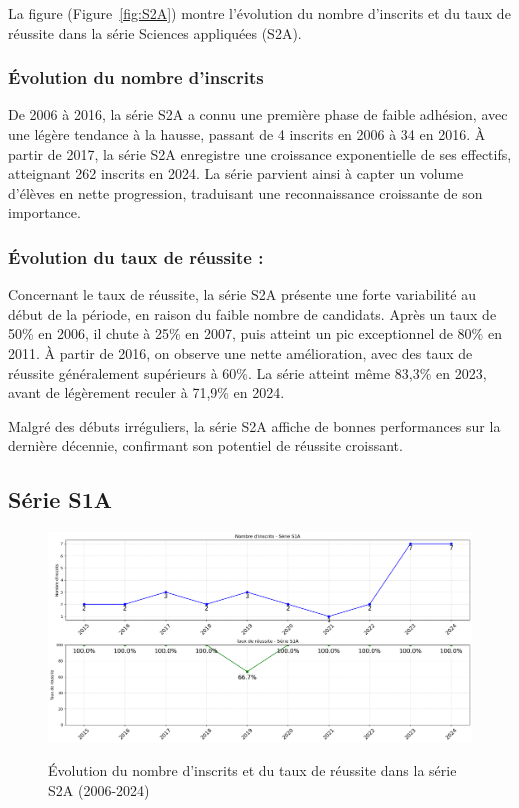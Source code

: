 La figure (Figure~\ref{fig:S2A}) montre l'évolution du nombre d'inscrits et du taux de réussite dans la série Sciences appliquées (S2A).

\subsubsection{Évolution du nombre d'inscrits}
De 2006 à 2016, la série S2A a connu une première phase de faible adhésion, avec une légère tendance à la hausse, passant de 4 inscrits en 2006 à 34 en 2016.
À partir de 2017, la série S2A enregistre une croissance exponentielle de ses effectifs, atteignant 262 inscrits en 2024.
La série parvient ainsi à capter un volume d’élèves en nette progression, traduisant une reconnaissance croissante de son importance.

\subsubsection{Évolution du taux de réussite :}
Concernant le taux de réussite, la série S2A présente une forte variabilité au début de la période, en raison du faible nombre de candidats. Après un taux de 50\% en 2006, il chute à 25\% en 2007, puis atteint un pic exceptionnel de 80\% en 2011.
À partir de 2016, on observe une nette amélioration, avec des taux de réussite généralement supérieurs à 60\%. La série atteint même 83,3\% en 2023, avant de légèrement reculer à 71,9\% en 2024.

\bigskip

Malgré des débuts irréguliers, la série S2A affiche de bonnes performances sur la dernière décennie, confirmant son potentiel de réussite croissant.

\subsection{Série S1A}

\begin{figure}[ht]
\centering
\caption{Évolution du nombre d'inscrits et du taux de réussite dans la série S2A (2006-2024)}
\includegraphics[width=1\textwidth]{figure/bac_S1A.png}
\label{fig:S1A}
\end{figure}

